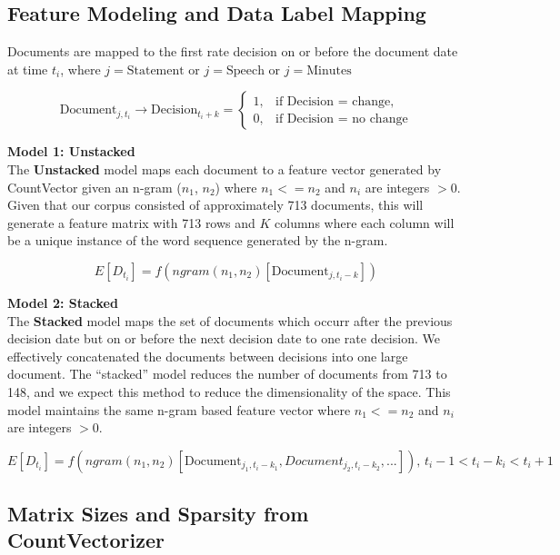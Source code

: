 \documentclass[11pt]{article}
\begin{document}
{\subsection{Feature Modeling and Data Label Mapping}
\noindent Documents are mapped to the first rate decision on or before the document date at time $t_i$, where $j=\text{Statement}$ or $j=\text{Speech}$ or $j=\text{Minutes}$

\begin{equation*}
\mbox{Document}_{j,t_i} \rightarrow \mbox{Decision}_{t_i+k}
 = \begin{cases}
  1, & \text{if  Decision = change}, \\
  0, & \text{if  Decision = no change}
\end{cases}
\end{equation*}

\noindent 
\textbf{Model 1: Unstacked}\\
\noindent
The \textbf{Unstacked} model maps each document to a feature vector generated by CountVector given an n-gram ($n_1$, $n_2$) where $n_1 <= n_2$ and $n_i$ are integers $>0$.  Given that our corpus consisted of approximately 713 documents, this will generate a feature matrix with 713 rows and $K$ columns where each column will be a unique instance of the word sequence generated by the n-gram.

\begin{equation*}
E[D_{t_i}] = f(ngram(n_1, n_2)[\mbox{Document}_{j,t_i-k}])
\end{equation*}

\noindent
\textbf{Model 2: Stacked}\\
The \textbf{Stacked} model maps the set of documents which occurr after the previous decision date but on or before the next decision date to one rate decision.  We effectively concatenated the documents between decisions into one large document.  The ``stacked'' model reduces the number of documents from 713 to 148, and we expect this method to reduce the dimensionality of the space.  This model maintains the same n-gram based feature vector where $n_1 <= n_2$ and $n_i$ are integers $>0$.

\begin{equation*}
E[D_{t_i}] = f(ngram(n_1, n_2)[\mbox{Document}_{j_1,t_i-k_1},{Document}_{j_2,t_i-k_2},...]) \text{, } t_i-1 < t_i-k_i < t_i+1
\end{equation*}

\subsection{Matrix Sizes and Sparsity from CountVectorizer}

}
\end{document}
